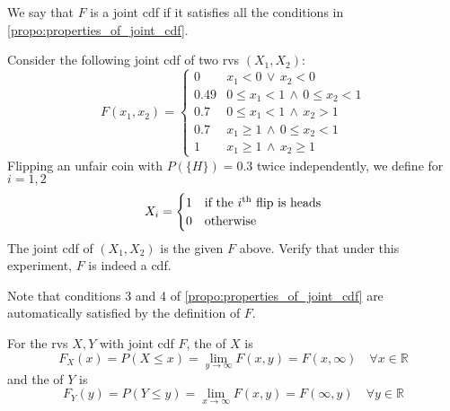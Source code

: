 \documentclass[notoc,notitlepage]{tufte-book}
\begin{document}
\begin{note}
    We say that $F$ is a joint cdf if it satisfies all the conditions in \cref{propo:properties_of_joint_cdf}.
\end{note}

\begin{eg}[Example 3.1]\label{eg:eg_3_1}
  Consider the following joint cdf of two rvs $(X_1, X_2)$:
  \begin{equation*}
    F(x_1, x_2) = \begin{cases}
      0    & x_1 < 0 \, \lor \, x_2 < 0 \\
      0.49 & 0 \leq x_1 < 1 \, \land \, 0 \leq x_2 < 1 \\
      0.7  & 0 \leq x_1 < 1 \, \land \, x_2 > 1 \\
      0.7  & x_1 \geq 1 \, \land \, 0 \leq x_2 < 1 \\
      1    & x_1 \geq 1 \, \land \, x_2 \geq 1
    \end{cases}
  \end{equation*}
  Flipping an unfair coin with $P(\{H\}) = 0.3$ twice independently, we define for $i = 1, 2$
  \begin{equation*}
    X_i = \begin{cases}
      1 & \text{if the } i \text{\textsuperscript{th} flip is heads} \\
      0 & \text{otherwise}
    \end{cases}
  \end{equation*}
  The joint cdf of $(X_1, X_2)$ is the given $F$ above. Verify that under this experiment, $F$ is indeed a cdf.

  \begin{solution}
    Note that conditions 3 and 4 of \cref{propo:properties_of_joint_cdf} are automatically satisfied by the definition of $F$.

  \end{solution}
\end{eg}

\begin{defn}
\label{defn:marginal_cdf}
  For the rvs $X, Y$ with joint cdf $F$, the  of $X$ is
  \begin{equation*}
    F_X(x) = P(X \leq x) = \lim_{y \to \infty} F(x, y) = F(x, \infty) \quad \forall x \in \mathbb{R}
  \end{equation*}
  and the  of $Y$ is
  \begin{equation*}
    F_Y(y) = P(Y \leq y) = \lim_{x \to \infty} F(x, y) = F(\infty, y) \quad \forall y \in \mathbb{R}
  \end{equation*}
\end{defn}
\end{document}
